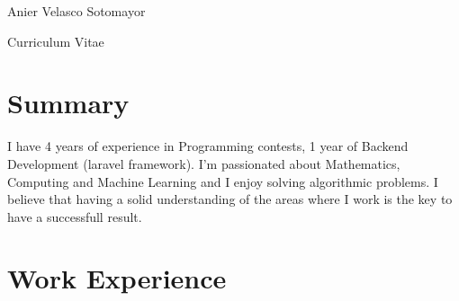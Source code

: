 \documentclass[
	10pt, %
]{FreemanCV}
\begin{document}
\begin{paracol}{2} %


\parbox[][0.11\textheight][c]{\linewidth}{ %
	\centering %
	
	{\sffamily\Huge Anier Velasco Sotomayor} %
	
	\medskip %
	
	{\Huge\textcolor{headings}{Curriculum Vitae}}
	
	\vfill %
}

\section*{Summary}

I have 4 years of experience in Programming contests, 1 year of Backend Development (laravel framework).
I'm passionated about Mathematics, Computing and Machine Learning and I enjoy solving algorithmic problems.
I believe that having a solid understanding of the areas where I work is the key to have a successfull result.



\section{Work Experience}




\end{paracol}
\end{document}
